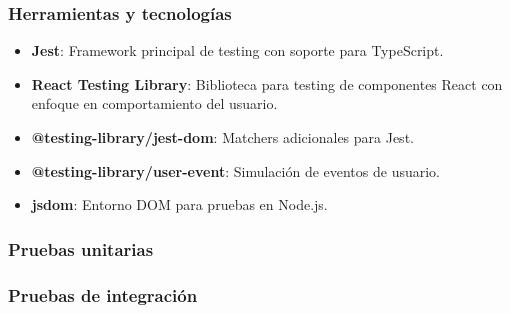 \subsubsection{Herramientas y tecnologías}
\begin{itemize}
    \item \textbf{Jest}: Framework principal de testing con soporte para TypeScript.
    \item \textbf{React Testing Library}: Biblioteca para testing de componentes React con enfoque en comportamiento del usuario.
    \item \textbf{@testing-library/jest-dom}: Matchers adicionales para Jest.
    \item \textbf{@testing-library/user-event}: Simulación de eventos de usuario.
    \item \textbf{jsdom}: Entorno DOM para pruebas en Node.js.
\end{itemize}

\subsubsection{Pruebas unitarias}

\subsubsection{Pruebas de integración}
